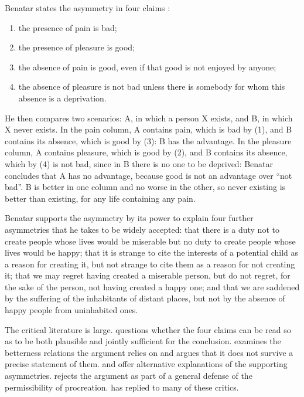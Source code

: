 \documentclass{situationist-preprint}
\begin{document}
Benatar states the asymmetry in four claims \citep[ch.~2]{Benatar2006}:
\begin{enumerate}[label=(\arabic*)]
\item the presence of pain is bad;
\item the presence of pleasure is good;
\item the absence of pain is good, even if that good is not enjoyed by anyone;
\item the absence of pleasure is not bad unless there is somebody for whom this absence is a deprivation.
\end{enumerate}
He then compares two scenarios: A, in which a person X exists, and B, in which X never exists. In the pain column, A contains pain, which is bad by (1), and B contains its absence, which is good by (3): B has the advantage. In the pleasure column, A contains pleasure, which is good by (2), and B contains its absence, which by (4) is not bad, since in B there is no one to be deprived: Benatar concludes that A has no advantage, because good is not an advantage over \enquote{not bad}. B is better in one column and no worse in the other, so never existing is better than existing, for any life containing any pain.

Benatar supports the asymmetry by its power to explain four further asymmetries that he takes to be widely accepted: that there is a duty not to create people whose lives would be miserable but no duty to create people whose lives would be happy; that it is strange to cite the interests of a potential child as a reason for creating it, but not strange to cite them as a reason for not creating it; that we may regret having created a miserable person, but do not regret, for the sake of the person, not having created a happy one; and that we are saddened by the suffering of the inhabitants of distant places, but not by the absence of happy people from uninhabited ones.

The critical literature is large. \citet{Harman2009} questions whether the four claims can be read so as to be both plausible and jointly sufficient for the conclusion. \citet{Bradley2010} examines the betterness relations the argument relies on and argues that it does not survive a precise statement of them. \citet{DeGrazia2010} and \citet{Metz2011} offer alternative explanations of the supporting asymmetries. \citet{Overall2012} rejects the argument as part of a general defense of the permissibility of procreation. \citet{Benatar2013} has replied to many of these critics.
\end{document}
